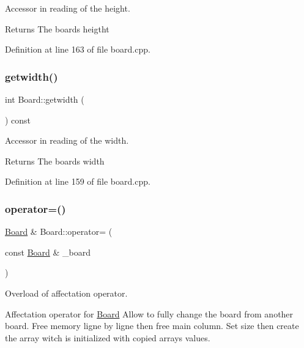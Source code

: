 Accessor in reading of the height. 

\begin{DoxyReturn}{Returns}
The board\textquotesingle{}s heigtht 
\end{DoxyReturn}


Definition at line 163 of file board.\+cpp.

\hypertarget{class_board_a503f6433c6b70b70d79a775f53a46d77}{}\label{class_board_a503f6433c6b70b70d79a775f53a46d77} 
\subsubsection{\texorpdfstring{getwidth()}{getwidth()}}
{\footnotesize\ttfamily int Board\+::getwidth (\begin{DoxyParamCaption}{ }\end{DoxyParamCaption}) const}



Accessor in reading of the width. 

\begin{DoxyReturn}{Returns}
The board\textquotesingle{}s width 
\end{DoxyReturn}


Definition at line 159 of file board.\+cpp.

\hypertarget{class_board_ac67493bc18a85bffd6d31b294e0298b9}{}\label{class_board_ac67493bc18a85bffd6d31b294e0298b9} 
\subsubsection{\texorpdfstring{operator=()}{operator=()}}
{\footnotesize\ttfamily \hyperlink{class_board}{Board} \& Board\+::operator= (\begin{DoxyParamCaption}\item[{const \hyperlink{class_board}{Board} \&}]{\+\_\+board }\end{DoxyParamCaption})}



Overload of affectation operator. 

Affectation operator for \hyperlink{class_board}{Board} Allow to fully change the board from another board. Free memory ligne by ligne then free main column. Set size then create the array witch is initialized with copied array\textquotesingle{}s values.



